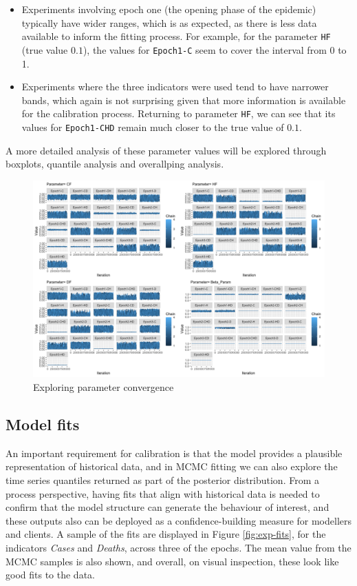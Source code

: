 \documentclass[10pt,letterpaper]{article}
\begin{document}
\begin{itemize}
\item
  Experiments involving epoch one (the opening phase of the epidemic) typically have wider ranges, which is as expected, as there is less data available to inform the fitting process. For example, for the parameter \texttt{HF} (true value \(0.1\)), the values for \texttt{Epoch1-C} seem to cover the interval from 0 to 1.
\item
  Experiments where the three indicators were used tend to have narrower bands, which again is not surprising given that more information is available for the calibration process. Returning to parameter \texttt{HF}, we can see that its values for \texttt{Epoch1-CHD} remain much closer to the true value of \(0.1\).
\end{itemize}

A more detailed analysis of these parameter values will be explored through boxplots, quantile analysis and overallping analysis.

\begin{figure}
\includegraphics[width=1\linewidth]{diagrams/exp_convergence} \caption{Exploring parameter convergence}\label{fig:exp-conv}
\end{figure}

\hypertarget{model-fits}{%
\subsection{Model fits}\label{model-fits}}

An important requirement for calibration is that the model provides a plausible representation of historical data, and in MCMC fitting we can also explore the time series quantiles returned as part of the posterior distribution. From a process perspective, having fits that align with historical data is needed to confirm that the model structure can generate the behaviour of interest, and these outputs also can be deployed as a confidence-building measure for modellers and clients. A sample of the fits are displayed in Figure \ref{fig:exp-fits}, for the indicators \emph{Cases} and \emph{Deaths}, across three of the epochs. The mean value from the MCMC samples is also shown, and overall, on visual inspection, these look like good fits to the data.
\end{document}
